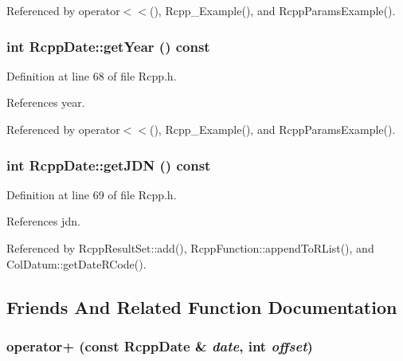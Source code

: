 Referenced by operator$<$$<$(), Rcpp\_\-Example(), and RcppParamsExample().\hypertarget{classRcppDate_79a7696fbce7b448ab545ce35c40811b}{
\subsubsection[getYear]{\setlength{\rightskip}{0pt plus 5cm}int RcppDate::getYear () const}}
\label{classRcppDate_79a7696fbce7b448ab545ce35c40811b}




Definition at line 68 of file Rcpp.h.

References year.

Referenced by operator$<$$<$(), Rcpp\_\-Example(), and RcppParamsExample().\hypertarget{classRcppDate_71332de00640903fe99ce13a37fd9f67}{
\subsubsection[getJDN]{\setlength{\rightskip}{0pt plus 5cm}int RcppDate::getJDN () const}}
\label{classRcppDate_71332de00640903fe99ce13a37fd9f67}




Definition at line 69 of file Rcpp.h.

References jdn.

Referenced by RcppResultSet::add(), RcppFunction::appendToRList(), and ColDatum::getDateRCode().

\subsection{Friends And Related Function Documentation}
\hypertarget{classRcppDate_dd881a27c2b8e36897a59bca1d04585f}{
\subsubsection[operator+]{ operator+ (const {\bf RcppDate} \& {\em date}, \/  int {\em offset})}}
\label{classRcppDate_dd881a27c2b8e36897a59bca1d04585f}




